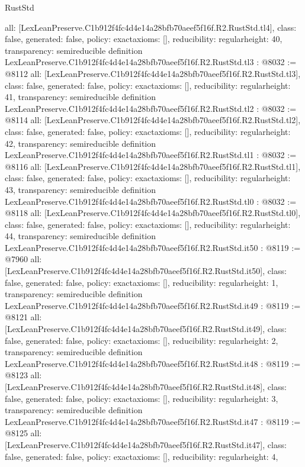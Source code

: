 \begin{lexlean}{RustStd}
\begin{coremodule}
{  all: [LexLeanPreserve.C1b912f4fc4d4e14a28bfb70aeef5f16f.R2.RustStd.tl4],
  class: false,
  generated: false,
  policy: exact{axioms: []},
  reducibility: regular{height: 40},
  transparency: semireducible
}
definition LexLeanPreserve.C1b912f4fc4d4e14a28bfb70aeef5f16f.R2.RustStd.tl3 : @8032 := @8112 {
  all: [LexLeanPreserve.C1b912f4fc4d4e14a28bfb70aeef5f16f.R2.RustStd.tl3],
  class: false,
  generated: false,
  policy: exact{axioms: []},
  reducibility: regular{height: 41},
  transparency: semireducible
}
definition LexLeanPreserve.C1b912f4fc4d4e14a28bfb70aeef5f16f.R2.RustStd.tl2 : @8032 := @8114 {
  all: [LexLeanPreserve.C1b912f4fc4d4e14a28bfb70aeef5f16f.R2.RustStd.tl2],
  class: false,
  generated: false,
  policy: exact{axioms: []},
  reducibility: regular{height: 42},
  transparency: semireducible
}
definition LexLeanPreserve.C1b912f4fc4d4e14a28bfb70aeef5f16f.R2.RustStd.tl1 : @8032 := @8116 {
  all: [LexLeanPreserve.C1b912f4fc4d4e14a28bfb70aeef5f16f.R2.RustStd.tl1],
  class: false,
  generated: false,
  policy: exact{axioms: []},
  reducibility: regular{height: 43},
  transparency: semireducible
}
definition LexLeanPreserve.C1b912f4fc4d4e14a28bfb70aeef5f16f.R2.RustStd.tl0 : @8032 := @8118 {
  all: [LexLeanPreserve.C1b912f4fc4d4e14a28bfb70aeef5f16f.R2.RustStd.tl0],
  class: false,
  generated: false,
  policy: exact{axioms: []},
  reducibility: regular{height: 44},
  transparency: semireducible
}
definition LexLeanPreserve.C1b912f4fc4d4e14a28bfb70aeef5f16f.R2.RustStd.it50 : @8119 := @7960 {
  all: [LexLeanPreserve.C1b912f4fc4d4e14a28bfb70aeef5f16f.R2.RustStd.it50],
  class: false,
  generated: false,
  policy: exact{axioms: []},
  reducibility: regular{height: 1},
  transparency: semireducible
}
definition LexLeanPreserve.C1b912f4fc4d4e14a28bfb70aeef5f16f.R2.RustStd.it49 : @8119 := @8121 {
  all: [LexLeanPreserve.C1b912f4fc4d4e14a28bfb70aeef5f16f.R2.RustStd.it49],
  class: false,
  generated: false,
  policy: exact{axioms: []},
  reducibility: regular{height: 2},
  transparency: semireducible
}
definition LexLeanPreserve.C1b912f4fc4d4e14a28bfb70aeef5f16f.R2.RustStd.it48 : @8119 := @8123 {
  all: [LexLeanPreserve.C1b912f4fc4d4e14a28bfb70aeef5f16f.R2.RustStd.it48],
  class: false,
  generated: false,
  policy: exact{axioms: []},
  reducibility: regular{height: 3},
  transparency: semireducible
}
definition LexLeanPreserve.C1b912f4fc4d4e14a28bfb70aeef5f16f.R2.RustStd.it47 : @8119 := @8125 {
  all: [LexLeanPreserve.C1b912f4fc4d4e14a28bfb70aeef5f16f.R2.RustStd.it47],
  class: false,
  generated: false,
  policy: exact{axioms: []},
  reducibility: regular{height: 4},
}
\end{coremodule}
\end{lexlean}
